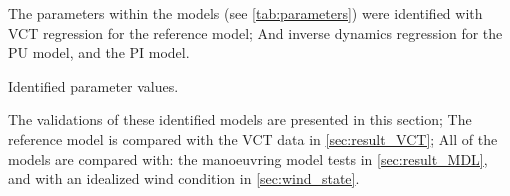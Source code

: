 The parameters within the models (see \autoref{tab:parameters}) were identified with VCT regression for the reference model; And inverse dynamics regression for the PU model, and the PI model. 
\begin{table}[h]
    \centering
    \caption{Identified parameter values.}
    \label{tab:parameters}
\end{table}

The validations of these identified models are presented in this section; The reference model is compared with the VCT data in \autoref{sec:result_VCT}; All of the models are compared with: the manoeuvring model tests in \autoref{sec:result_MDL}, and with an idealized wind condition in \autoref{sec:wind_state}.